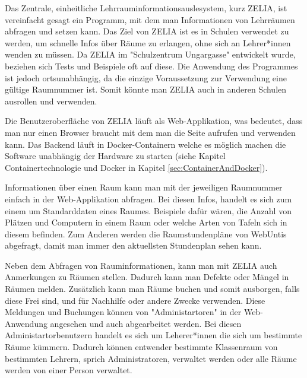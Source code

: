 

Das Zentrale, einheitliche Lehrrauminformationsauslesystem, kurz ZELIA, ist vereinfacht gesagt ein Programm, mit dem man Informationen von Lehrräumen abfragen und setzen kann. Das Ziel von ZELIA ist es in Schulen verwendet zu werden, um schnelle Infos über Räume zu erlangen, ohne sich an Lehrer*innen wenden zu müssen. Da ZELIA im "Schulzentrum Ungargasse" entwickelt wurde, beziehen sich Tests und Beispiele oft auf diese. Die Anwendung des Programmes ist jedoch ortsunabhängig, da die einzige Voraussetzung zur Verwendung eine gültige Raumnummer ist. Somit könnte man ZELIA auch in anderen Schulen ausrollen und verwenden. 

Die Benutzeroberfläche von ZELIA läuft als Web-Applikation, was bedeutet, dass man nur einen Browser braucht mit dem man die Seite aufrufen und verwenden kann. Das Backend läuft in Docker-Containern welche es möglich machen die Software unabhängig der Hardware zu starten (siehe Kapitel Containertechnologie und Docker in Kapitel \ref{sec:ContainerAndDocker}).

Informationen über einen Raum kann man mit der jeweiligen Raumnummer einfach in der Web-Applikation abfragen. Bei diesen Infos, handelt es sich zum einem um Standarddaten eines Raumes. Beispiele dafür wären, die Anzahl von Plätzen und Computern in einem Raum oder welche Arten von Tafeln sich in diesem befinden. Zum Anderen werden die Raumstundenpläne von WebUntis abgefragt, damit man immer den aktuellsten Stundenplan sehen kann.

Neben dem Abfragen von Rauminformationen, kann man mit ZELIA auch Anmerkungen zu Räumen stellen. Dadurch kann man Defekte oder Mängel in Räumen melden. Zusätzlich kann man Räume buchen und somit ausborgen, falls diese Frei sind, und für Nachhilfe oder andere Zwecke verwenden. Diese Meldungen und Buchungen können von "Administartoren" in der Web-Anwendung angesehen und auch abgearbeitet werden. Bei diesen Administartorbenutzern handelt es sich um Leherer*innen die sich um bestimmte Räume kümmern. Dadurch können entwender bestimmte Klassenraum von bestimmten Lehrern, sprich Administratoren, verwaltet werden oder alle Räume werden von einer Person verwaltet.

